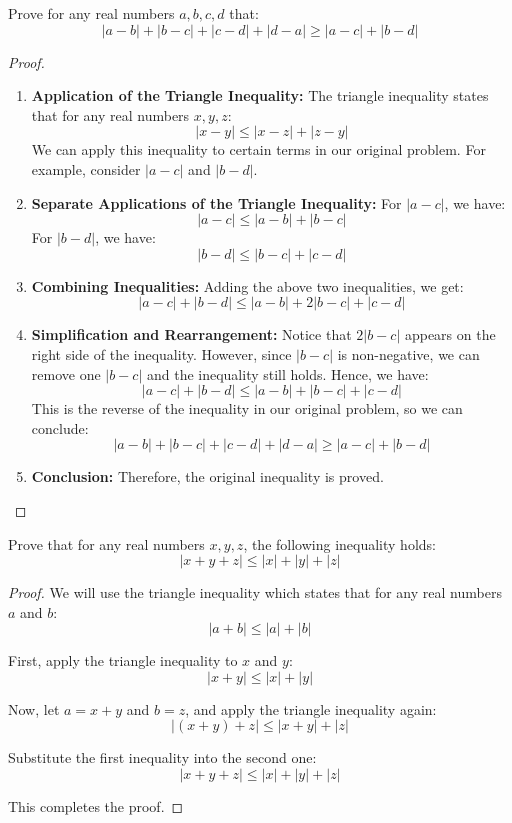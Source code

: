 \begin{exercise}
    Prove for any real numbers \( a, b, c, d \) that:
\[ |a - b| + |b - c| + |c - d| + |d - a| \geq |a - c| + |b - d| \]

\end{exercise}

\begin{proof}
    \begin{enumerate}
    \item \textbf{Application of the Triangle Inequality:}
    The triangle inequality states that for any real numbers \( x, y, z \):
    \[ |x - y| \leq |x - z| + |z - y| \]
    We can apply this inequality to certain terms in our original problem. For example, consider \( |a - c| \) and \( |b - d| \).

    \item \textbf{Separate Applications of the Triangle Inequality:}
    For \( |a - c| \), we have:
    \[ |a - c| \leq |a - b| + |b - c| \]
    For \( |b - d| \), we have:
    \[ |b - d| \leq |b - c| + |c - d| \]

    \item \textbf{Combining Inequalities:}
    Adding the above two inequalities, we get:
    \[ |a - c| + |b - d| \leq |a - b| + 2|b - c| + |c - d| \]

    \item \textbf{Simplification and Rearrangement:}
    Notice that \( 2|b - c| \) appears on the right side of the inequality. However, since \( |b - c| \) is non-negative, we can remove one \( |b - c| \) and the inequality still holds. Hence, we have:
    \[ |a - c| + |b - d| \leq |a - b| + |b - c| + |c - d| \]
    This is the reverse of the inequality in our original problem, so we can conclude:
    \[ |a - b| + |b - c| + |c - d| + |d - a| \geq |a - c| + |b - d| \]

    \item \textbf{Conclusion:}
    Therefore, the original inequality is proved.
\end{enumerate}
\end{proof}
\begin{exercise}
    Prove that for any real numbers \( x, y, z \), the following inequality holds:
\[ |x + y + z| \leq |x| + |y| + |z| \]

\end{exercise}
\begin{proof}
    We will use the triangle inequality which states that for any real numbers \( a \) and \( b \):
\[ |a + b| \leq |a| + |b| \]

First, apply the triangle inequality to \( x \) and \( y \):
\[ |x + y| \leq |x| + |y| \]

Now, let \( a = x + y \) and \( b = z \), and apply the triangle inequality again:
\[ |(x + y) + z| \leq |x + y| + |z| \]

Substitute the first inequality into the second one:
\[ |x + y + z| \leq |x| + |y| + |z| \]

This completes the proof.
\end{proof}
